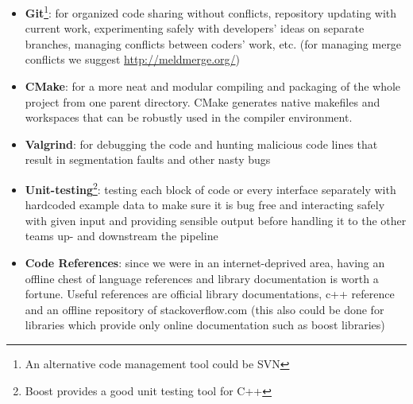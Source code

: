 \begin{itemize}
  \item \textbf{Git}\footnote{An alternative code management tool could be SVN}: for organized code sharing without conflicts, repository updating with current work, experimenting safely with developers' ideas on separate branches, managing conflicts between coders' work, etc. (for managing merge conflicts we suggest \href{meld}{http://meldmerge.org/})
  \item \textbf{CMake}: for a more neat and modular compiling and packaging of the whole project from one parent directory. CMake generates native makefiles and workspaces that can be robustly used in the compiler environment.
  \item \textbf{Valgrind}: for debugging the code and hunting malicious code lines that result in segmentation faults and other nasty bugs
  \item \textbf{Unit-testing}\footnote{Boost provides a good unit testing tool for C++}: testing each block of code or every interface separately with hardcoded example data to make sure it is bug free and interacting safely with given input and providing sensible output before handling it to the other teams up- and downstream the pipeline\label{unit_testing}
  \item \textbf{Code References}: since we were in an internet-deprived area, having an offline chest of language references and library documentation is worth a fortune. Useful references are official library documentations, c++ reference and an offline repository of stackoverflow.com (this also could be done for libraries which provide only online documentation such as boost libraries)
\end{itemize}

